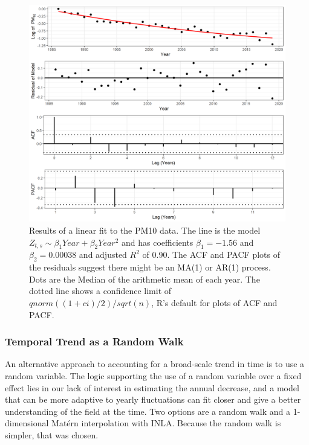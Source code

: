 \documentclass{article}
\begin{document}
\begin{figure}[ht]
	\centering
	\includegraphics[width = \textwidth]{Figures/explore_ts_exp_quad_fit.png}
	\caption{Results of a linear fit to the PM10 data.  The line is the model $Z_{t,s} \sim \beta_1 Year+ \beta_2 Year^2$ and has coefficients $\beta_1 = -1.56$ and $\beta_2 = 0.00038$ and adjusted $R^2$ of  0.90.  The \ac{ACF} and \ac{PACF} plots of the residuals suggest there might be an MA(1) or AR(1) process.  Dots are the Median of the arithmetic mean of each year. The dotted line shows a confidence limit of $qnorm((1 + ci)/2)/sqrt(n)$, R's default for plots of ACF and PACF. }
	\label{fig:explore_ts_exp_quad_fit}
\end{figure}

\subsubsection*{Temporal Trend as a Random Walk} \label{subsubsec:RWexploration}
An alternative approach to accounting for a broad-scale trend in time is to use a random variable.  The logic supporting the use of a random variable over a fixed effect lies in our lack of interest in estimating the annual decrease, and a model that can be more adaptive to yearly fluctuations can fit closer and give a better understanding of the field at the time.  Two options are a random walk and a 1-dimensional Mat\'{e}rn interpolation with \ac{INLA}.  Because the random walk is simpler, that was chosen.
\end{document}
